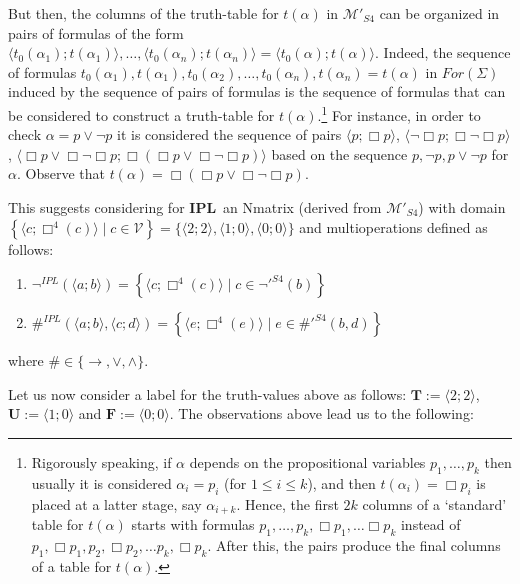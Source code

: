 \documentclass[12pt]{article}
\newcommand{\bT}{\mathbf{T}}
\newcommand{\bU}{\mathbf{U}}
\newcommand{\bF}{\mathbf{F}}
\newcommand{\ipl}{\ensuremath{\mathbf{IPL}}}
\begin{document}

But then, the columns of the  truth-table for  $t(\alpha)$ in $\mathcal{M}'_{S4}$ can be organized in pairs of formulas of the form $\langle t_0(\alpha_1);t(\alpha_1)\rangle, \ldots , \langle t_0(\alpha_n);t(\alpha_n)\rangle= \langle t_0(\alpha);t(\alpha)\rangle$.  Indeed, the sequence of formulas $ t_0(\alpha_1),t(\alpha_1),t_0(\alpha_2), \ldots , t_0(\alpha_n),t(\alpha_n)=t(\alpha)$ in $For(\Sigma)$ induced by the sequence of pairs of formulas is the sequence of formulas that can be considered to construct a truth-table for $t(\alpha)$.\footnote{Rigorously speaking, if $\alpha$ depends on the propositional variables $p_1,\ldots,p_k$ then usually it is considered $\alpha_i=p_i$ (for $1 \leq i \leq k$), and then $t(\alpha_i)=\Box p_i$ is placed at a latter stage, say $\alpha_{i+k}$. Hence, the first $2k$ columns of a `standard' table for $t(\alpha)$ starts with formulas $p_1,\ldots,p_k,\Box p_1, \ldots \Box p_k$ instead of $p_1,\Box p_1,p_2,\Box p_2,\ldots p_k,\Box p_k$. After this, the pairs produce the final columns of a table for $t(\alpha)$.} For instance, in order to check $\alpha=p \vee \neg p$ it is considered the sequence of pairs $\langle p;\Box p\rangle$, $\langle \neg \Box p; \Box \neg \Box p\rangle$, $\langle \Box p \lor \Box \neg \Box p; \Box (\Box p \lor \Box \neg \Box p)\rangle$ based on the sequence $p,\neg p, p \vee \neg p$ for $\alpha$. Observe that $t(\alpha)=\Box (\Box p \lor \Box \neg \Box p)$.



This suggests considering for \ipl\ an Nmatrix (derived from $\mathcal{M}'_{S4}$) with domain  $\left\{ \langle c; \Box^{4}(c) \rangle \mid c \in \mathcal{V} \right\} = \{ \langle 2; 2 \rangle, \langle 1; 0 \rangle, \langle 0; 0 \rangle\}$ and multioperations defined as follows:

 \begin{enumerate}
        \item $\neg^{IPL} (\langle a; b \rangle) = \left\{ \langle c; \Box^{4}(c) \rangle \mid c \in {\neg'}^{S4}(b) \right\}$
        \item $\#^{IPL} (\langle a; b \rangle, \langle c; d \rangle) = \left\{ \langle e; \Box^{4}(e) \rangle\mid e \in {\#'}^{S4}(b, d)  \right\} $
    \end{enumerate}
    where $\# \in \{ \rightarrow, \lor, \land \}$.

Let us now consider a label for the truth-values above as follows:  $\bT := \langle 2; 2 \rangle$, $\bU := \langle 1; 0 \rangle$ and $\bF := \langle 0; 0 \rangle$. The observations above lead us to the following:
\end{document}
